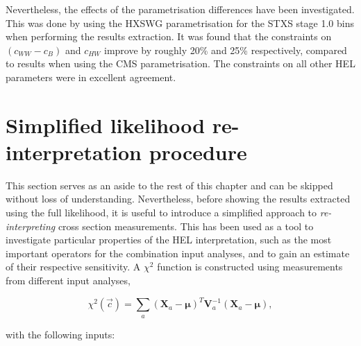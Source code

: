 Nevertheless, the effects of the parametrisation differences have been investigated. This was done by using the HXSWG parametrisation for the STXS stage 1.0 bins when performing the results extraction. It was found that the constraints on $(c_{WW}-c_B)$ and $c_{HW}$ improve by roughly 20\% and 25\% respectively, compared to results when using the CMS parametrisation. The constraints on all other HEL parameters were in excellent agreement.

\section{Simplified likelihood re-interpretation procedure}\label{sec:eft_simplified}
This section serves as an aside to the rest of this chapter and can be skipped without loss of understanding. Nevertheless, before showing the results extracted using the full likelihood, it is useful to introduce a simplified approach to \textit{re-interpreting} cross section measurements. This has been used as a tool to investigate particular properties of the HEL interpretation, such as the most important operators for the combination input analyses, and to gain an estimate of their respective sensitivity. A $\chi^2$ function is constructed using measurements from different input analyses,

\begin{equation}
    \chi^2(\vec{c}) = \sum_a (\mathbf{X}_a-\pmb{\mu})^T \mathbf{V}_a^{-1} (\mathbf{X}_a-\pmb{\mu}),
\end{equation}

\noindent
with the following inputs:

